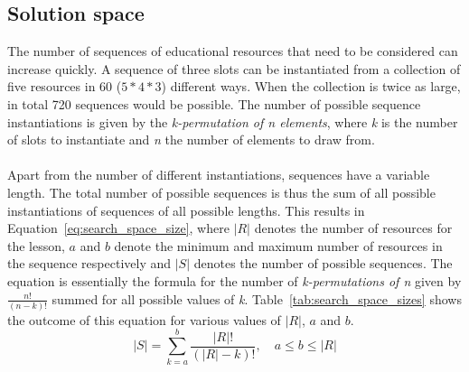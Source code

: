 \subsection{Solution space}
The number of sequences of educational resources that need to be considered can
increase quickly. A sequence of three slots can be instantiated from a
collection of five resources in 60 ($5*4*3$) different ways. When the
collection is twice as large, in total 720 sequences would be possible. The
number of possible sequence instantiations is given by the \emph{k-permutation
of n elements}, where \emph{k} is the number of slots to instantiate and
\emph{n} the number of elements to draw from.\\\\
\noindent
Apart from the number of different instantiations, sequences have a variable
length.  The total number of possible sequences is thus the sum of all possible
instantiations of sequences of all possible lengths. This results in
Equation~\ref{eq:search_space_size}, where $|R|$ denotes the number of
resources for the lesson, $a$ and $b$ denote the minimum and maximum number of
resources in the sequence respectively and $|S|$ denotes the number of possible
sequences. The equation is essentially the formula for the number of
\emph{k-permutations of n} given by $\tfrac{n!}{(n-k)!}$ summed for all
possible values of \emph{k}.
Table~\ref{tab:search_space_sizes} shows the outcome of this 
equation for various values of $|R|$, $a$ and $b$.
\begin{equation}
	\label{eq:search_space_size}
	|S| = \sum_{k=a}^{b} \frac{|R|!}{(|R|-k)!}, \quad a \le b \le |R|
\end{equation}
